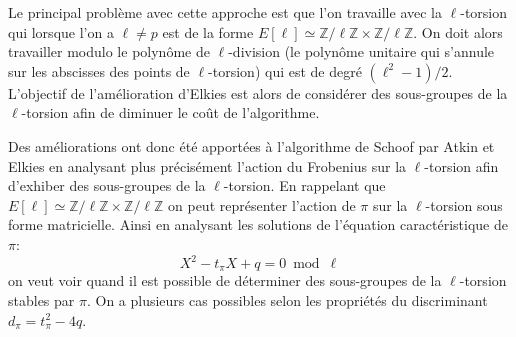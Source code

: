 \documentclass[10pt,a4paper]{book}
\theoremstyle{plain}
\theoremstyle{definition}
\theoremstyle{definition}
\theoremstyle{definition}
\theoremstyle{definition}
\theoremstyle{remark}
\theoremstyle{remark}
\theoremstyle{definition}
\begin{document}
Le principal problème avec cette approche est que l'on travaille avec la $\ell$-torsion qui lorsque l'on a $\ell \neq p$ est de la forme $E[\ell] \simeq \mathbb{Z}/\ell \mathbb{Z} \times \mathbb{Z}/\ell \mathbb{Z}$. On doit alors travailler modulo le polynôme de $\ell$-division (le polynôme unitaire qui s'annule sur les abscisses des points de $\ell$-torsion) qui est de degré $(\ell^2-1)/2$. L'objectif de l'amélioration d'Elkies est alors de considérer des sous-groupes de la $\ell$-torsion afin de diminuer le coût de l'algorithme.

Des améliorations ont donc été apportées à l'algorithme de Schoof par Atkin et Elkies en analysant plus précisément l'action du Frobenius sur la $\ell$-torsion afin d'exhiber des sous-groupes de la $\ell$-torsion. En  rappelant que $E[\ell] \simeq \mathbb{Z}/\ell \mathbb{Z} \times \mathbb{Z}/\ell \mathbb{Z}$ on peut représenter l'action de $\pi$ sur la $\ell$-torsion sous forme matricielle. Ainsi en analysant les solutions de l'équation caractéristique de $\pi$:
\begin{equation*}
X^2-t_{\pi}X+q = 0 \bmod \ell
\end{equation*} 
on veut voir quand il est possible de déterminer des sous-groupes de la 
$\ell$-torsion stables par $\pi$.
On a plusieurs cas possibles selon les propriétés du discriminant $d_{\pi}=t_{\pi}^2-4q$.
\end{document}
